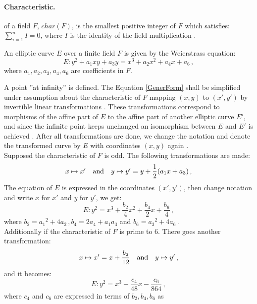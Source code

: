 \paragraph{Characteristic.} of a field $F$, $char(F)$, is the smallest
positive integer of $F$ which satisfies: $\sum_{i=1}^{n}I=0$, where
$I$ is the identity of the field multiplication \cite{SimpleTutorial}.

An elliptic curve $E$ over a finite field $F$ is given by the
Weierstrass equation:
\begin{equation}
  E : y^2 + a_1xy + a_3y = x^3 + a_2x^2 + a_4x + a_6\,, \label{GenerForm}
\end{equation}
where $a_1,a_2,a_3,a_4,a_6$ are coefficients in $F$.

A point ”at infinity” is defined. The Equation \ref{GenerForm} shall
be simplified under assumption about the characteristic of $F$ mapping
$(x,y)$ to $(x',y')$ by invertible linear transformations
\cite{Cohen}. These transformations correspond to morphisms of the
affine part of $E$ to the affine part of another elliptic curve $E'$,
and since the infinite point keeps unchanged an isomorphism between
$E$ and $E'$ is achieved \cite{Cohen}. After all transformations are
done, we change the notation and denote the transformed curve by $E$
with coordinates $(x,y)$ again \cite{Cohen}.\\ Supposed the
characteristic of $F$ is odd. The following transformations are made:
\begin{equation*}
x\mapsto x'\quad\hbox{and}\quad y\mapsto y'= y + \frac{1}{2}(a_1x +a_3)\,,
\end{equation*}
The equation of $E$ is expressed in the coordinates $(x',y')$, then
change notation and write $x$ for $x'$ and $y$ for $y'$, we get:
\begin{equation*}
E:y^2 = x^3 + \frac{b_2}{4}x^2 + \frac{b_4}{2}x + \frac{b_6}{4}\,,
\end{equation*}
where $b_2={a_1}^2+4a_2$\,,\,$b_4=2a_4+a_1a_3$ and
$b_6={a_3}^2+4a_6$\,.\\ Additionally if the characteristic of $F$ is
prime to 6. There goes another transformation:
\begin{equation*}
x\mapsto x'=x+\frac{b_2}{12}\quad\hbox{and}\quad y\mapsto y'\,,
\end{equation*}
and it becomes:
\begin{equation*}
E:y^2 = x^3 - \frac{c_4}{48}x - \frac{c_6}{864}\,,
\end{equation*}
where $c_4$ and $c_6$ are expressed in terms of $b_2,b_4,b_6$ as
